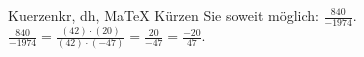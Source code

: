 \begin{MAufgabe}{Kuerzen}{kr, dh, MaTeX}
K\"urzen Sie soweit m\"oglich: $\frac{840}{-1974}$.\\ 
\ifLsg\MLoesung
\quad $\frac{840}{-1974}=\frac{(42)\cdot(20)}{(42)\cdot(-47)}=\frac{20}{-47}=\frac{-20}{47}$.\else\relax\fi
 \end{MAufgabe}